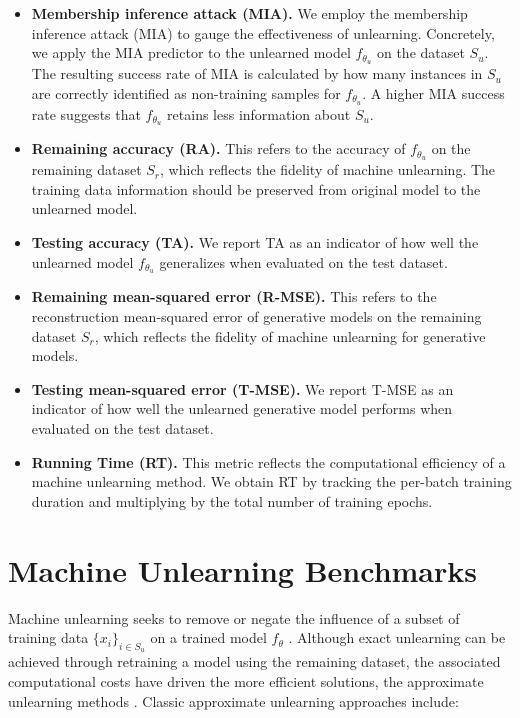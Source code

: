 \begin{itemize}[itemsep=0pt, parsep=0pt, leftmargin=*] %
	\item \textbf{Membership inference attack (MIA).} We employ the membership inference attack (MIA) \citep{song2019privacy,yeom2018privacy} to gauge the effectiveness of unlearning. Concretely, we apply the MIA predictor to the unlearned model $f_{\theta_u}$ on the dataset $S_u$. The resulting success rate of MIA is calculated by how many instances in $S_u$ are correctly identified as non-training samples for $f_{\theta_u}$. A higher MIA success rate suggests that $f_{\theta_u}$ retains less information about $S_u$.
	\item  \textbf{Remaining accuracy (RA).} This refers to the accuracy of $f_{\theta_u}$ on the remaining dataset $S_r$, which reflects the fidelity of machine unlearning. The training data information should be preserved from original model to the unlearned model.
	\item \textbf{Testing accuracy (TA).} We report TA as an indicator of how well the unlearned model $f_{\theta_u}$ generalizes when evaluated on the test dataset.
		\item  \textbf{Remaining mean-squared error (R-MSE).} This refers to the reconstruction mean-squared error of generative models on the remaining dataset $S_r$, which reflects the fidelity of machine unlearning for generative models.
	\item \textbf{Testing mean-squared error (T-MSE).} We report T-MSE as an indicator of how well the unlearned generative model performs when evaluated on the test dataset.
	\item  \textbf{Running Time (RT).} This metric reflects the computational efficiency of a machine unlearning method. We obtain RT by tracking the per-batch training duration and multiplying by the total number of training epochs.
\end{itemize}







\section{Machine Unlearning Benchmarks} \label{revisiting_mu}

Machine unlearning seeks to remove or negate the influence of a subset of training data $\{x_i\}_{i \in S_u}$ on a trained model $f_{\theta}$ \citep{bourtoule2021machine,warnecke2024machine}. Although exact unlearning can be achieved through retraining a model using the remaining dataset, the associated computational costs have driven the more efficient solutions, the approximate unlearning methods \citep{shen2024labelagnostic,izzo2021approximate}. Classic approximate unlearning approaches include:

